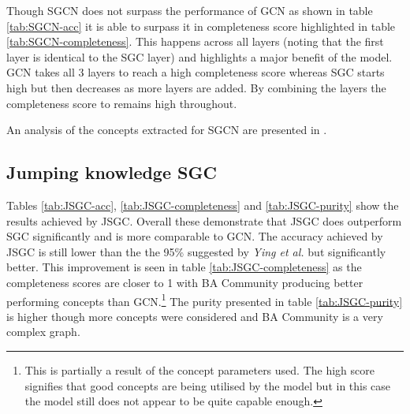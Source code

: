 Though SGCN does not surpass the performance of GCN as shown in table \ref{tab:SGCN-acc} it is able to surpass it in completeness score highlighted in table \ref{tab:SGCN-completeness}.
This happens across all layers (noting that the first layer is identical to the SGC layer) and highlights a major benefit of the model.
GCN takes all 3 layers to reach a high completeness score whereas SGC starts high but then decreases as more layers are added.
By combining the layers the completeness score to remains high throughout.

An analysis of the concepts extracted for SGCN are presented in .

\subsection{Jumping knowledge SGC}
\label{sec:Jump-SGC}





Tables \ref{tab:JSGC-acc}, \ref{tab:JSGC-completeness} and \ref{tab:JSGC-purity} show the results achieved by JSGC.
Overall these demonstrate that JSGC does outperform SGC significantly and is more comparable to GCN.
The accuracy achieved by JSGC is still lower than the the 95\% suggested by \textit{Ying et al.}\cite{ying2019gnnexplainer} but significantly better.
This improvement is seen in table \ref{tab:JSGC-completeness} as the completeness scores are closer to 1 with BA Community producing better performing concepts than GCN.\footnote{This is partially a result of the concept parameters used. The high score signifies that good concepts are being utilised by the model but in this case the model still does not appear to be quite capable enough.}
The purity presented in table \ref{tab:JSGC-purity} is higher though more concepts were considered and BA Community is a very complex graph.



